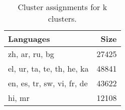 \begin{table}
\caption{Cluster assignments for {k} clusters.}
\label{tab:chung_clusters_k4}
\begin{tabular}{lr}
\toprule
Languages & Size \\
\midrule
zh, ar, ru, bg & 27425 \\
el, ur, ta, te, th, he, ka & 48841 \\
en, es, tr, sw, vi, fr, de & 43622 \\
hi, mr & 12108 \\
\bottomrule
\end{tabular}
\end{table}

